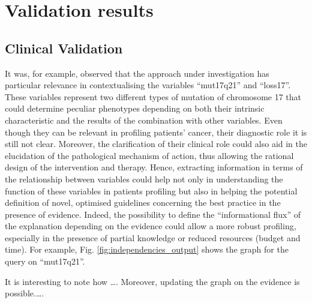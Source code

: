 \section{Validation results}
\subsection{Clinical Validation}
It was, for example, observed that the approach under investigation has particular relevance in contextualising the variables \enquote{mut17q21} and \enquote{loss17}.
These variables represent two different types of mutation of chromosome 17 that could determine peculiar phenotypes depending on both their intrinsic characteristic and the results of the combination with other variables. 
Even though they can be relevant in profiling patients’ cancer, their diagnostic role it is still not clear. 
Moreover, the clarification of their clinical role could also aid in the elucidation of the pathological mechanism of action, thus allowing the rational design of the intervention and therapy. 
Hence, extracting information in terms of the relationship between variables could help not only in understanding the function of these variables in patients profiling but also in helping the potential definition of novel, optimised guidelines concerning the best practice in the presence of evidence. 
Indeed, the possibility to define the \enquote{informational flux} of the explanation depending on the evidence could allow a more robust profiling, especially in the presence of partial knowledge or reduced resources (budget and time).
For example, Fig. \ref{fig:independencies_output} shows the graph for the query on \enquote{mut17q21}.
 
It is interesting to note how ….
Moreover, updating the graph on the evidence is possible.….


